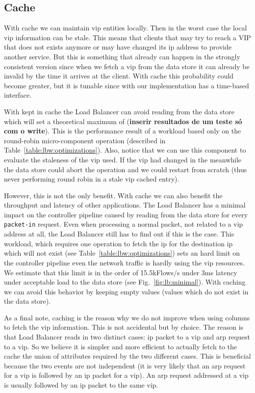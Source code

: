 \subsection{Cache}
With cache  we can maintain \gls{vip} entities locally. Then in the worst case the local \gls{vip} information can be stale.
This means that  clients that may try to reach a VIP that does not exists anymore or may have changed its \gls{ip}  address to provide another service. 
But this is something that already can happen in the strongly consistent version since when we fetch a \gls{vip} from the data store it can already be invalid by the time it arrives at the client. 
With cache this probability could become greater,  but it is tunable  since with our implementation has a time-based interface.

With   kept in cache the Load Balancer can avoid reading from the data store which will set a theoretical maximum of (\textbf{inserir resultados de um teste só com o write}). This is the performance result of a workload based only on  the round-robin micro-component operation (described in Table~\ref{table:lbw:optimizations}). Also, notice that we can use this component to evaluate the staleness of the \gls{vip} used. If the \gls{vip} had changed in the meanwhile the data store could abort the operation and we could restart from scratch (thus never performing round robin in a stale \gls{vip} cached entry). 

However, this is not the only benefit.  With cache we can also benefit the throughput and latency of other applications. 
The Load Balancer has a minimal impact on the controller pipeline caused by reading from the data store for every \texttt{packet-in} request.  
Even when processing a normal packet, not related to a \gls{vip} address at all, the Load Balancer still has to find out if this is the case. 
This workload, which requires one operation to fetch the \gls{ip} for the destination \gls{ip} which will not exist  (see Table~\ref{table:lbw:optimizations})  sets an hard limit on the controller pipeline even the network traffic is hardly using the \gls{vip} resources. 
We estimate that this limit is in the order of 15.5kFlows/s under 3ms latency under acceptable load to the data store (see Fig.~\ref{fig:lb:minimal}).
With caching we can avoid this behavior by keeping empty values (values which do not exist in the data store).

As a final note, caching is the reason why we do not improve when using columns  to fetch the \gls{vip} information. 
This is not accidental but by choice. 
The reason is that Load Balancer reads  in two distinct cases: \gls{ip} packet to a \gls{vip} and \gls{arp} request to a \gls{vip}. 
So we believe it is simpler and more efficient to actually fetch to the cache the union of attributes required by the two different
cases. 
This is beneficial because the two events are not independent (it is very likely that an \gls{arp} request for a \gls{vip} is followed by an \gls{ip} packet for a \gls{vip}). 
An \gls{arp} request addressed at a \gls{vip} is usually followed by an \gls{ip} packet to the same \gls{vip}.  

